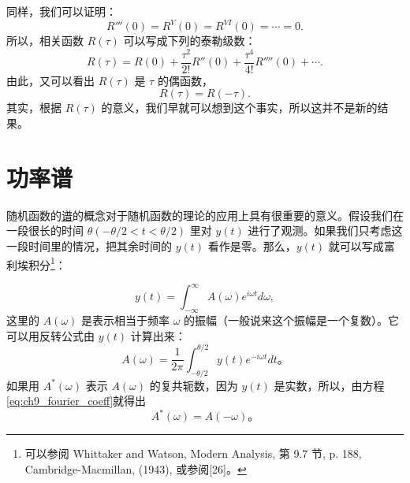 同样，我们可以证明：
\[
R'''(0) = R^{V}(0) = R^{VI}(0) = \cdots = 0.
\]
所以，相关函数 $ R(\tau) $ 可以写成下列的泰勒级数：
\[
R(\tau) = R(0) + \frac{\tau^2}{2!}R''(0) + \frac{\tau^4}{4!}R''''(0) + \cdots.
\]
由此，又可以看出 $ R(\tau) $ 是 $ \tau $ 的偶函数，
\[
R(\tau) = R(-\tau).
\]
其实，根据 $ R(\tau) $ 的意义，我们早就可以想到这个事实，所以这并不是新的结果。

\section{功率谱}

随机函数的\underline{谱}的概念对于随机函数的理论的应用上具有很重要的意义。假设我们在一段很长的时间 $ \theta(-\theta/2<t<\theta/2) $ 里对 $ y(t) $ 进行了观测。如果我们只考虑这一段时间里的情况，把其余时间的 $ y(t) $ 看作是零。那么，$ y(t) $ 就可以写成富利埃积分\footnote{可以参阅 Whittaker and Watson, Modern Analysis, 第 9.7 节, p. 188, Cambridge-Macmillan, (1943), 或参阅[26]。}：

\begin{equation}\label{eq:ch9_fourier_int}
y(t) = \int_{-\infty}^{\infty} A(\omega)e^{i\omega t}d\omega,
\end{equation}
这里的 $ A(\omega) $ 是表示相当于频率 $ \omega $ 的振幅（一般说来这个振幅是一个复数）。它可以用反转公式由 $ y(t) $ 计算出来：
\begin{equation}\label{eq:ch9_fourier_coeff}
A(\omega) = \frac{1}{2\pi} \int_{-\theta/2}^{\theta/2} y(t) e^{-i\omega t} dt。
\end{equation}
如果用 $ A^* (\omega) $ 表示 $ A(\omega) $ 的复共轭数，因为 $ y(t) $ 是实数，所以，由方程\eqref{eq:ch9_fourier_coeff}就得出
\begin{equation}\label{eq:ch9_conjugate}
A^* (\omega) = A(-\omega)。
\end{equation}

